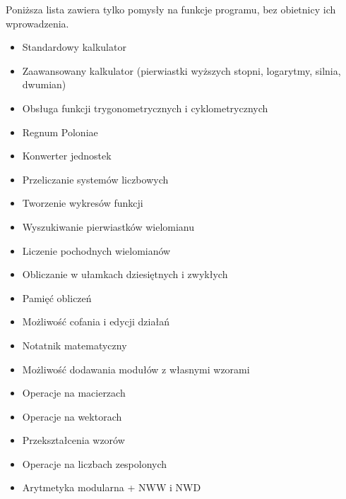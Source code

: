 Poniższa lista zawiera tylko pomysły na funkcje programu, bez obietnicy ich wprowadzenia.
\begin{itemize}
    \item Standardowy kalkulator
    \item Zaawansowany kalkulator (pierwiastki wyższych stopni, logarytmy, silnia, dwumian)
    \item Obsługa funkcji trygonometrycznych i cyklometrycznych
    \item Regnum Poloniae
    \item Konwerter jednostek
    \item Przeliczanie systemów liczbowych
    \item Tworzenie wykresów funkcji
    \item Wyszukiwanie pierwiastków wielomianu
    \item Liczenie pochodnych wielomianów
    \item Obliczanie w ułamkach dziesiętnych i zwykłych
    \item Pamięć obliczeń
    \item Możliwość cofania i edycji działań
    \item Notatnik matematyczny
    \item Możliwość dodawania modułów z własnymi wzorami
    \item Operacje na macierzach
    \item Operacje na wektorach
    \item Przekształcenia wzorów
    \item Operacje na liczbach zespolonych
    \item Arytmetyka modularna + NWW i NWD
\end{itemize}



















